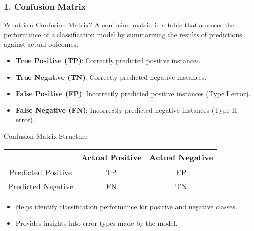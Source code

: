 \documentclass[aspectratio=169]{beamer}
\begin{document}
\begin{frame}[fragile]
    \frametitle{1. Confusion Matrix}
    \begin{block}{What is a Confusion Matrix?}
        A confusion matrix is a table that assesses the performance of a classification model by summarizing the results of predictions against actual outcomes.
    \end{block}
    
    \begin{itemize}
        \item \textbf{True Positive (TP)}: Correctly predicted positive instances.
        \item \textbf{True Negative (TN)}: Correctly predicted negative instances.
        \item \textbf{False Positive (FP)}: Incorrectly predicted positive instances (Type I error).
        \item \textbf{False Negative (FN)}: Incorrectly predicted negative instances (Type II error).
    \end{itemize}
    
    \begin{block}{Confusion Matrix Structure}
    \centering
    \begin{tabular}{|c|c|c|}
        \hline
                  & Actual Positive & Actual Negative \\
        \hline
        Predicted Positive & TP               & FP               \\
        \hline
        Predicted Negative & FN               & TN               \\
        \hline
    \end{tabular}
    \end{block}
    
    \begin{itemize}
        \item Helps identify classification performance for positive and negative classes.
        \item Provides insights into error types made by the model.
    \end{itemize}
\end{frame}
\end{document}
